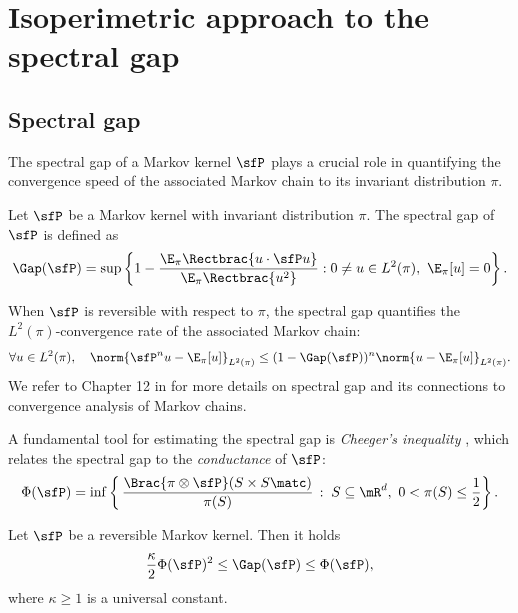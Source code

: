 \documentclass[11pt]{article}
\begin{document}
\section{Isoperimetric approach to the spectral gap}
\label{sec:Method}


\subsection{Spectral gap}
\label{sec:SpecGap}

The spectral gap of a Markov kernel $\sfP$ plays a crucial role in quantifying the convergence speed of the associated Markov chain to its invariant distribution $\pi$.


\begin{defn}
\label{defn:SpecGap}
Let $\sfP$ be a Markov kernel with invariant distribution $\pi$.
The spectral gap of $\sfP$ is defined as
\begin{equation}
\label{eqn:gap}
    \Gap(\sfP) = \sup \left\{ 1 - \frac{ \E_\pi \Rectbrac{ u \cdot \sfP u } }{ \E_\pi \Rectbrac{ u^2 } } : 0 \neq u \in L^2(\pi),~ \E_\pi [u] = 0 \right\}.
\end{equation}
\end{defn}

When $\sfP$ is reversible with respect to $\pi$, the spectral gap quantifies the $L^2(\pi)$-convergence rate of the associated Markov chain:
\begin{equation}
\label{eqn:L2conv}
    \forall u \in L^2(\pi), \quad \norm{\sfP^n u - \E_\pi[u] }_{L^2(\pi)} \le (1-\Gap(\sfP))^n \norm{u - \E_\pi[u] }_{L^2(\pi)}.
\end{equation}
We refer to Chapter 12 in \cite{MR2466937} for more details on spectral gap and its connections to convergence analysis of Markov chains.


A fundamental tool for estimating the spectral gap is \emph{Cheeger's inequality} \citep{MR402831}, which relates the spectral gap to the \emph{conductance} of $\sfP$:
\begin{equation}
\label{eqn:Cond}
    \Phi(\sfP) = \inf \left\{ \, \frac{ \Brac{\pi \otimes \sfP } (S \times S\matc)}{\pi(S)} \, :\; S \subseteq \mR^d,~ 0 < \pi(S) \le \frac{1}{2} \right\}.
\end{equation}


\begin{thm}[\cite{MR930082}]
\label{thm:ChIneq}
Let $\sfP$ be a reversible Markov kernel. Then it holds
\begin{equation}
\label{eqn:ChIneq}
    \frac{\kappa}{2} \Phi(\sfP)^2 \le \Gap(\sfP) \le \Phi(\sfP),
\end{equation}
where $\kappa \ge 1$ is a universal constant.
\end{thm}
\end{document}
